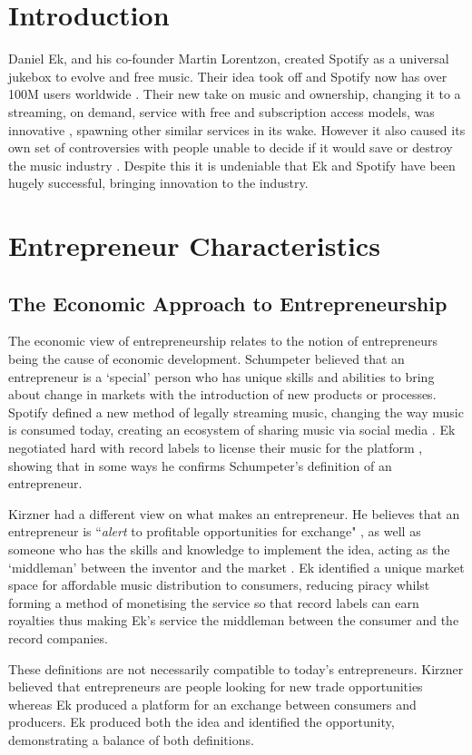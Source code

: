 \section{Introduction}
Daniel Ek, and his co-founder Martin Lorentzon, created Spotify as a universal jukebox to evolve and free music. Their idea took off and Spotify now has over 100M users worldwide \parencite{100m_spotify}. Their new take on music and ownership, changing it to a streaming, on demand, service with free and subscription access models, was innovative \parencite{wired_influencer}, spawning other similar services in its wake. However it also caused its own set of controversies with people unable to decide if it would save or destroy the music industry \parencite{guardian_swift, guardian_save_or_destroy}. Despite this it is undeniable that Ek and Spotify have been hugely successful, bringing innovation to the industry.

\section{Entrepreneur Characteristics}

\subsection{The Economic Approach to Entrepreneurship}
The economic view of entrepreneurship relates to the notion of entrepreneurs being the cause of economic development. Schumpeter believed that an entrepreneur is a `special' person \parencite[][9]{deakins2012} who has unique skills and abilities to bring about change in markets with the introduction of new products or processes. Spotify defined a new method of legally streaming music, changing the way music is consumed today, creating an ecosystem of sharing music via social media \parencite{dyer2013}. Ek negotiated hard with record labels to license their music for the platform \parencite{guardian_save_or_destroy}, showing that in some ways he confirms Schumpeter's definition of an entrepreneur.
\par
Kirzner had a different view on what makes an entrepreneur. He believes that an entrepreneur is ``\emph{alert} to profitable opportunities for exchange" \parencite[][8]{deakins2012}, as well as someone who has the skills and knowledge to implement the idea, acting as the `middleman' between the inventor and the market \parencite[][8]{deakins2012}. Ek identified a unique market space for affordable music distribution to consumers, reducing piracy whilst forming a method of monetising the service so that record labels can earn royalties \parencite{bertoni2012} thus making Ek's service the middleman between the consumer and the record companies.
\par
These definitions are not necessarily compatible to today's entrepreneurs. Kirzner believed that entrepreneurs are people looking for new trade opportunities whereas Ek produced a platform for an exchange between consumers and producers. Ek produced both the idea and identified the opportunity, demonstrating a balance of both definitions. 

